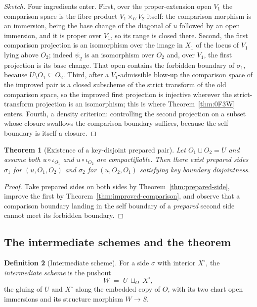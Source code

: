 \documentclass[11pt,a4paper]{article}
\theoremstyle{plain}
\newtheorem{theorem}{Theorem}[section]
\theoremstyle{definition}
\newtheorem{definition}[theorem]{Definition}
\theoremstyle{remark}
\begin{document}
\begin{proof}[Sketch]
Four ingredients enter. First, over the proper-extension open $V_1$ the
comparison space is the fibre product $V_1\times_U V_2$ itself: the comparison
morphism is an immersion, being the base change of the diagonal of $u$ followed
by an open immersion, and it is proper over $V_1$, so its range is closed
there. Second, the first comparison projection is an isomorphism over the image
in $X_1$ of the locus of $V_1$ lying above $O_2$; indeed $\psi_2$ is an
isomorphism over $O_2$ and, over $V_1$, the first projection is its base
change. That open contains the forbidden boundary of $\sigma_1$, because
$U\setminus O_1\subseteq O_2$. Third, after a $V_1$-admissible blow-up the
comparison space of the improved pair is a closed subscheme of the strict
transform of the old comparison space, so the improved first projection is
injective wherever the strict-transform projection is an isomorphism; this is
where Theorem~\ref{thm:0F3W} enters. Fourth, a density criterion: controlling
the second projection on a subset whose closure swallows the comparison
boundary suffices, because the self boundary is itself a closure.
\end{proof}

\begin{theorem}[Existence of a key-disjoint prepared pair]
\label{thm:two-open-preparation}
Let $O_1\sqcup O_2=U$ and assume both $u\circ\iota_{O_1}$ and
$u\circ\iota_{O_2}$ are compactifiable. Then there exist prepared sides
$\sigma_1$ for $(u,O_1,O_2)$ and $\sigma_2$ for $(u,O_2,O_1)$ satisfying key
boundary disjointness.
\end{theorem}

\begin{proof}
Take prepared sides on both sides by Theorem~\ref{thm:prepared-side}, improve
the first by Theorem~\ref{thm:improved-comparison}, and observe that a
comparison boundary landing in the self boundary of a \emph{prepared} second
side cannot meet its forbidden boundary.
\end{proof}

\subsection{The intermediate schemes and the theorem}

\begin{definition}[Intermediate scheme]
\label{def:intermediate}
For a side $\sigma$ with interior $X^{\circ}$, the \emph{intermediate scheme}
is the pushout
\[
  W \;=\; U\ \sqcup_{O}\ X^{\circ},
\]
the gluing of $U$ and $X^{\circ}$ along the embedded copy of $O$, with its two
chart open immersions and its structure morphism $W\to S$.
\end{definition}
\end{document}
